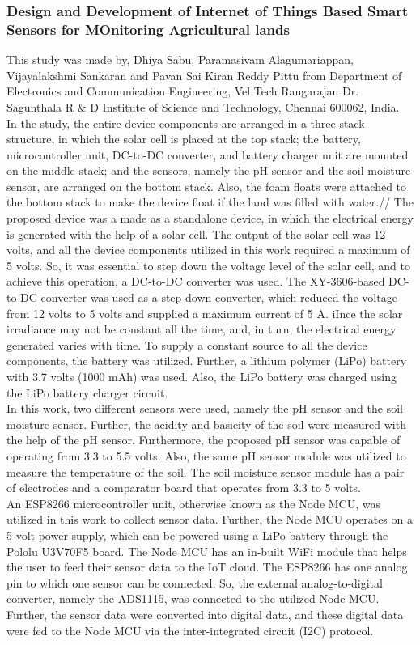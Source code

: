 \documentclass[12pt, a4paper]{article}
\begin{document}
\subsubsection{Design and Development of Internet of Things Based Smart Sensors for MOnitoring Agricultural lands}
This study was made by, Dhiya Sabu, Paramasivam Alagumariappan, Vijayalakshmi Sankaran and Pavan Sai Kiran Reddy Pittu \cite{sabu2023design} from Department of Electronics and Communication Engineering, Vel Tech Rangarajan Dr. Sagunthala R \& D Institute of Science and Technology, Chennai 600062, India.\\
In the study, the entire device components are arranged in a three-stack structure, in which the solar cell is placed at the top stack; the battery, microcontroller unit, DC-to-DC converter, and battery charger unit are mounted on the middle stack; and the sensors, namely the pH sensor and the soil moisture sensor, are arranged on the bottom stack. Also, the foam floats were attached to the bottom stack to make the device float if the land was filled with water.//
The proposed device was a made as a standalone device, in which the electrical energy is generated with the help of a solar cell. The output of the solar cell was 12 volts, and all the device components utilized in this work required a maximum of 5 volts. So, it was essential to step down the voltage level of the solar cell, and to achieve this operation, a DC-to-DC converter was used. The XY-3606-based DC-to-DC converter was used as a step-down converter, which reduced the voltage from 12 volts to 5 volts and supplied a maximum current of 5 A. iInce the solar irradiance may not be constant all the time, and, in turn, the electrical energy generated varies with time. To supply a constant source to all the device components, the battery was utilized. Further, a lithium polymer (LiPo) battery with 3.7 volts (1000 mAh) was used. Also, the LiPo battery was charged using the LiPo battery charger circuit.\\
In this work, two different sensors were used, namely the pH sensor and the soil moisture sensor. Further, the acidity and basicity of the soil were measured with the help of the pH sensor. Furthermore, the proposed pH sensor was capable of operating from 3.3 to 5.5 volts. Also, the same pH sensor module was utilized to measure the temperature of the soil. The soil moisture sensor module has a pair of electrodes and a comparator board that operates from 3.3 to 5 volts.\\
An ESP8266 microcontroller unit, otherwise known as the Node MCU, was utilized in this work to collect sensor data. Further, the Node MCU operates on a 5-volt power supply, which can be powered using a LiPo battery through the Pololu U3V70F5 board. The Node MCU has an in-built WiFi module that helps the user to feed their sensor data to the IoT cloud. The ESP8266 has one analog pin to which one sensor can be connected. So, the external analog-to-digital converter, namely the ADS1115, was connected to the utilized Node MCU. Further, the sensor data were converted into digital data, and these digital data were fed to the Node MCU via the inter-integrated circuit (I2C) protocol.\\
\end{document}
